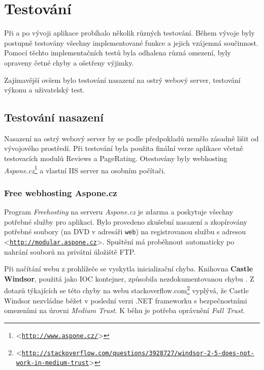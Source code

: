 \documentclass[11pt,twoside,a4paper]{book}
\let\oldUrl\url
\renewcommand\url[1]{<\texttt{\oldUrl{#1}}>}
\begin{document}
\chapter{Testování}
\label{sec:testovani}

Při a po vývoji aplikace probíhalo několik různých testování. Během vývoje byly postupně testovány všechny implementované funkce a jejich vzájemná součinnost. Pomocí těchto implementačních testů byla odhalena různá omezení, byly opraveny četné chyby a ošetřeny výjimky.

Zajímavější ovšem bylo testování nasazení na ostrý webový server, testování výkonu a uživatelský test.

\section{Testování nasazení}

Nasazení na ostrý webový server by se podle předpokladů nemělo zásadně lišit od vývojového prostředí. Při testování byla použita finální verze aplikace včetně testovacích modulů \textsf{Reviews} a \textsf{PageRating}. Otestovány byly webhosting \emph{Aspone.cz}\footnote{\url{http://www.aspone.cz/}} a vlastní IIS server na osobním počítači.

\subsection{Free webhosting Aspone.cz}
Program \emph{Freehosting} na serveru \emph{Aspone.cz} je zdarma a poskytuje všechny potřebné služby pro aplikaci. Bylo provedeno zkušební nasazení a zkopírovány potřebné soubory (na DVD v adresáři \texttt{web}) na registrovanou službu s adresou \url{http://modular.aspone.cz}. Spuštění má proběhnout automaticky po nahrání souborů na privátní úložiště FTP.

Při načítání webu z prohlížeče se vyskytla inicializační chyba. Knihovna \textbf{Castle Windsor}, použitá jako IOC kontejner, způsobila nezdokumentovanou chybu . Z dotazů týkajících se této chyby na webu stackoverflow.com\footnote{\url{http://stackoverflow.com/questions/3928727/windsor-2-5-does-not-work-in-medium-trust}} vyplývá, že Castle Windsor nezvládne běžet v poslední verzi .NET frameworku s bezpečnostními omezeními na úrovni \textit{Medium Trust}. K běhu je potřeba oprávnění \textit{Full Trust}. 
\end{document}

